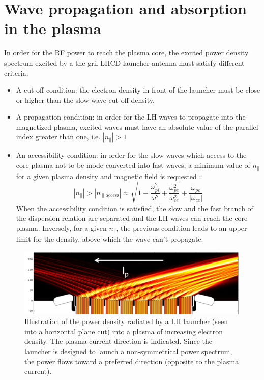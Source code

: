 \section{Wave propagation and absorption in the plasma}
In order for the RF power to reach the plasma core, the excited power density spectrum excited by a the gril LHCD launcher antenna must satisfy different criteria: 

\begin{itemize}
\item  A cut-off condition: the electron density in front of the launcher must be close or higher than the slow-wave cut-off density.
\item A propagation condition: in order for the LH waves to propagate into the magnetized plasma, excited waves must have an absolute value of the parallel index greater than one, i.e. $|n_{\parallel}|>1$ 
\item An accessibility condition: in order for the slow waves which access to the core plasma not to be mode-converted into fast waves, a minimum value of $n_{\parallel}$ for a given plasma density and magnetic field is requested :
$$
|n_{\parallel} |>| n_{\parallel \mathrm{access}} | 
\approx 
\sqrt{1 
	- \frac{\omega_{pi}^2}{\omega^2} 
	+ \frac{\omega_{pe}^2}{\omega_{ce}^2}}
+ \frac{\omega_{pe} }{| \omega_{ce} |}
$$ 
When the accessibility condition is satisfied, the slow and the fast branch of the dispersion relation are separated and the LH waves can reach the core plasma.
Inversely, for a given $n_{\parallel}$, the previous condition leads to an upper limit for the density, above which the wave can’t propagate.
\end{itemize}

\begin{figure}
\centering
\includegraphics[width=0.9\linewidth]{Figures/LHCD/C3_powerflow}
\caption{Illustration of the power density radiated by a LH launcher (seen into a horizontal plane cut) into a plasma of increasing electron density. The plasma current direction is indicated. Since the launcher is designed to launch a non-symmetrical power spectrum, the power flows toward a preferred direction (opposite to the plasma current).}
\label{fig:c3powerflow}
\end{figure}



